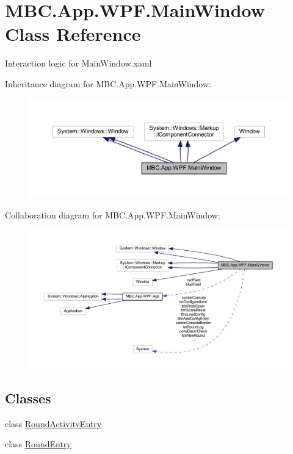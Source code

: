 \hypertarget{class_m_b_c_1_1_app_1_1_w_p_f_1_1_main_window}{\section{M\-B\-C.\-App.\-W\-P\-F.\-Main\-Window Class Reference}
\label{class_m_b_c_1_1_app_1_1_w_p_f_1_1_main_window}
}


Interaction logic for Main\-Window.\-xaml  




Inheritance diagram for M\-B\-C.\-App.\-W\-P\-F.\-Main\-Window\-:
\nopagebreak
\begin{figure}[H]
\begin{center}
\leavevmode
\includegraphics[width=350pt]{class_m_b_c_1_1_app_1_1_w_p_f_1_1_main_window__inherit__graph}
\end{center}
\end{figure}


Collaboration diagram for M\-B\-C.\-App.\-W\-P\-F.\-Main\-Window\-:
\nopagebreak
\begin{figure}[H]
\begin{center}
\leavevmode
\includegraphics[width=350pt]{class_m_b_c_1_1_app_1_1_w_p_f_1_1_main_window__coll__graph}
\end{center}
\end{figure}
\subsection*{Classes}
\begin{DoxyCompactItemize}
\item 
class \hyperlink{class_m_b_c_1_1_app_1_1_w_p_f_1_1_main_window_1_1_round_activity_entry}{Round\-Activity\-Entry}
\item 
class \hyperlink{class_m_b_c_1_1_app_1_1_w_p_f_1_1_main_window_1_1_round_entry}{Round\-Entry}
\end{DoxyCompactItemize}

